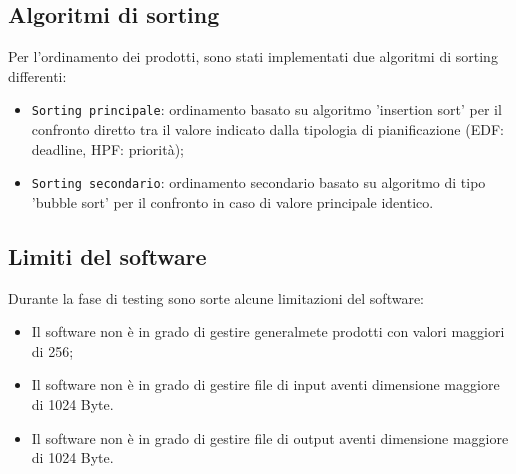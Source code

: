 \documentclass[a4paper]{report}
\begin{document}
  \subsection{Algoritmi di sorting}
  Per l'ordinamento dei prodotti, sono stati implementati due algoritmi di sorting differenti:

    \begin{itemize}
      \item \texttt{Sorting principale}: ordinamento basato su algoritmo 'insertion sort' per il confronto diretto tra il valore indicato dalla tipologia di pianificazione (EDF: deadline, HPF: priorità);
      \item \texttt{Sorting secondario}: ordinamento secondario basato su algoritmo di tipo 'bubble sort' per il confronto in caso di valore principale identico.
    \end{itemize}
    
    \subsection{Limiti del software}
    Durante la fase di testing sono sorte alcune limitazioni del software:

      \begin{itemize}
        \item Il software non è in grado di gestire generalmete prodotti con valori maggiori di 256;
        \item Il software non è in grado di gestire file di input aventi dimensione maggiore di 1024 Byte.
        \item Il software non è in grado di gestire file di output aventi dimensione maggiore di 1024 Byte.
      \end{itemize}
\end{document}
